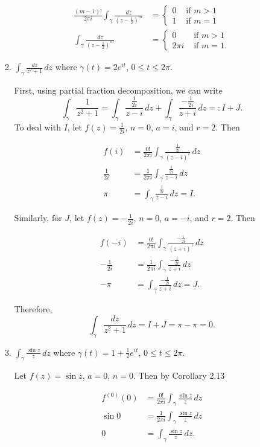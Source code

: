\documentclass[11pt,oneside,english]{amsart}
\theoremstyle{definition}
\begin{document}
\begin{enumerate}[leftmargin=*]
\begin{enumerate}
\begin{align*}
\frac{(m-1)!}{2\pi i}\int_\gamma \frac{dz}{(z-\frac{1}{2})^m}&=\begin{cases}0 & \text{ if $m>1$}\\ 1 & \text{ if $m=1$}\end{cases}\\[2mm]
\int_\gamma \frac{dz}{(z-\frac{1}{2})^m}&=\begin{cases}0 & \text{ if $m>1$}\\ 2\pi i & \text{ if $m=1$.}\end{cases}
\end{align*}

\item $\displaystyle \int_\gamma \frac{dz}{z^2+1}\,dz$ where $\gamma(t)=2e^{it}$, $0\leq t\leq 2\pi$.

First, using partial fraction decomposition, we can write 
\[
\int_\gamma\frac{1}{z^2+1}=\int_\gamma \frac{\frac{1}{2i}}{z-i}\,dz+\int_\gamma\frac{-\frac{1}{2i}}{z+i}\,dz=:I+J.
\]
To deal with $I$, let $f(z)=\frac{1}{2i}$, $n=0$, $a=i$, and $r=2$. Then 

\begin{align*}
f(i)&=\frac{0!}{2\pi i}\int_\gamma \frac{\frac{1}{2i}}{(z-i)^1}\,dz\\[2mm]
\frac{1}{2i}&=\frac{1}{2\pi i}\int_\gamma \frac{\frac{1}{2i}}{z-i}\,dz\\[2mm]
\pi&=\int_\gamma \frac{\frac{1}{2i}}{z-i}\,dz=I.
\end{align*}

Similarly, for $J$, let $f(z)=-\frac{1}{2i}$, $n=0$, $a=-i$, and $r=2$. Then 

\begin{align*}
f(-i)&=\frac{0!}{2\pi i}\int_\gamma \frac{-\frac{1}{2i}}{(z+i)^1}\,dz\\[2mm]
-\frac{1}{2i}&=\frac{1}{2\pi i}\int_\gamma \frac{-\frac{1}{2i}}{z+i}\,dz\\[2mm]
-\pi &=\int_\gamma \frac{-\frac{1}{2i}}{z+i}\,dz=J.
\end{align*}

Therefore,
\[
\int_\gamma \frac{dz}{z^2+1}\,dz=I+J=\pi -\pi =0.
\]

\item $\displaystyle \int_\gamma \frac{\sin z}{z}\,dz$ where $\gamma(t)=1+\frac{1}{2}e^{it}$, $0\leq t\leq 2\pi$.

Let $f(z)=\sin z$, $a=0$, $n=0$. Then by Corollary 2.13

\begin{align*}
f^{(0)}(0)&=\frac{0!}{2\pi i}\int_\gamma \frac{\sin z}{z}\,dz\\[2mm]
\sin 0&=\frac{1}{2\pi i}\int_\gamma \frac{\sin z}{z}\,dz\\[2mm]
0&=\int_\gamma \frac{\sin z}{z}\,dz.
\end{align*}


\end{enumerate}
\end{enumerate}
\end{document}
